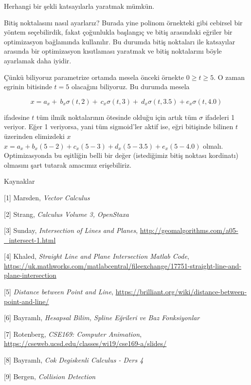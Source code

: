 \documentclass[12pt,fleqn]{article}\usepackage{../../common}
\begin{document}
Herhangi bir şekli katsayılarla yaratmak mümkün. 

Bitiş noktalasını nasıl ayarlarız? Burada yine polinom örnekteki gibi
cebirsel bir yöntem seçebilirdik, fakat çoğunlukla başlangıç ve bitiş
arasındaki eğriler bir optimizasyon bağlamında kullanılır. Bu durumda
bitiş noktaları ile katsayılar arasında bir optimizasyon kısıtlaması
yaratmak ve bitiş noktalarını böyle ayarlamak daha iyidir. 

Çünkü biliyoruz parametrize ortamda mesela önceki örnekte $0 \ge t \ge
5$. O zaman egrinin bitisinde $t=5$ olacağını biliyoruz. Bu durumda mesela 

$$
    x = a_x + \
        b_x \sigma(t,2) + \
        c_x \sigma(t,3) + \
        d_x \sigma(t,3.5) +
        e_x \sigma(t,4.0)
$$

ifadesine $t$ tüm ilmik noktalarının ötesinde olduğu için artık tüm
$\sigma$ ifadeleri 1 veriyor. Eğer 1 veriyorsa, yani tüm sigmoid'ler aktif
ise, eğri bitişinde bilinen $t$ üzerinden elimizdeki $x$ 
$x = a_x + b_x(5-2) + c_x(5-3) + d_x(5-3.5) + e_x(5-4.0)$
olmalı. Optimizasyonda bu eşitliğin belli bir değer (istediğimiz bitiş
noktası kordinatı) olmasını şart tutarak amacımız erişebiliriz.

Kaynaklar

[1] Marsden, {\em Vector Calculus}

[2] Strang, {\em Calculus Volume 3, OpenStaxa}

[3] Sunday, {\em Intersection of Lines and Planes}, 
\url{http://geomalgorithms.com/a05-_intersect-1.html}

[4] Khaled, {\em Straight Line and Plane Intersection Matlab Code}, 
\url{https://uk.mathworks.com/matlabcentral/fileexchange/17751-straight-line-and-plane-intersection}

[5] {\em Distance between Point and Line}, 
\url{https://brilliant.org/wiki/distance-between-point-and-line/}

[6] Bayramlı, {\em Hesapsal Bilim, Spline Eğrileri ve Baz Fonksiyonlar}

[7] Rotenberg, {\em CSE169: Computer Animation},
    \url{https://cseweb.ucsd.edu/classes/wi19/cse169-a/slides/}

[8] Bayramlı, {\em Cok Degiskenli Calculus - Ders 4}

[9] Bergen, {\em Collision Detection}
    
\end{document}
